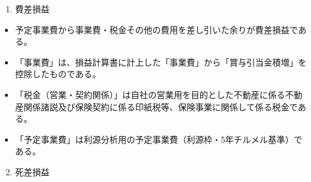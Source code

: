 \documentclass[report,gutter=10mm,fore-edge=10mm,uplatex,dvipdfmx]{jlreq}
\begin{document}
\begin{enumerate}
\tightlist
\item
  費差損益
\end{enumerate}

\begin{itemize}
\tightlist
\item
  予定事業費から事業費・税金その他の費用を差し引いた余りが費差損益である。
\item
  「事業費」は、損益計算書に計上した「事業費」から「賞与引当金積増」を控除したものである。
\item
  「税金（営業・契約関係）」は自社の営業用を目的とした不動産に係る不動産関係諸説及び保険契約に係る印紙税等、保険事業に関係して係る税金である。
\item
  「予定事業費」は利源分析用の予定事業費（利源枠・5年チルメル基準）である。
\end{itemize}

\begin{enumerate}
\setcounter{enumi}{1}
\tightlist
\item
  死差損益
\end{enumerate}
\end{document}
